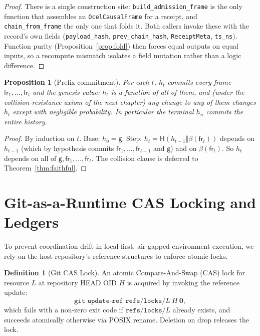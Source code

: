 \documentclass[11pt,oneside]{book}
\theoremstyle{definition}
\newtheorem{definition}{Definition}[chapter]
\theoremstyle{plain}
\newtheorem{proposition}[theorem]{Proposition}
\theoremstyle{remark}
\newcommand{\chainH}{\mathsf{H}}               %
\newcommand{\fr}{\mathsf{fr}}                   %
\newcommand{\body}{\beta}                       %
\newcommand{\code}[1]{\texttt{#1}}
\newcommand{\concat}{\mathbin{\Vert}}           %
\newcommand{\Genesis}{\mathsf{g}}               %
\begin{document}
\begin{proof}
There is a single construction site: \code{build\_admission\_frame} is the only function that
assembles an \code{OcelCausalFrame} for a receipt, and \code{chain\_from\_frame} the only one
that folds it. %
Both callers invoke these with the record's own fields
(\code{payload\_hash}, \code{prev\_chain\_hash}, \code{ReceiptMeta}, \code{ts\_ns}). %
Function
purity (Proposition~\ref{prop:fold}) then forces equal outputs on equal inputs, so a
recompute mismatch isolates a field mutation rather than a logic difference. %
 \end{proof}

\begin{proposition}[Prefix commitment]\label{prop:prefix}
For each $t$, $h_t$ commits every frame $\fr_1,\dots,\fr_t$ and the genesis value: $h_t$ is a
function of all of them, and (under the collision-resistance axiom of the next chapter) any
change to any of them changes $h_t$ except with negligible probability. %
In particular the
terminal $h_n$ commits the entire history. %
\end{proposition}

\begin{proof}
By induction on $t$. %
Base: $h_0=\Genesis$. %
Step: $h_t=\chainH(h_{t-1}\concat\body(\fr_t))$
depends on $h_{t-1}$ (which by hypothesis commits $\fr_1,\dots,\fr_{t-1}$ and $\Genesis$) and
on $\body(\fr_t)$. %
So $h_t$ depends on all of $\Genesis,\fr_1,\dots,\fr_t$. %
The collision
clause is deferred to Theorem~\ref{thm:faithful}. %
 \end{proof}

\section{Git-as-a-Runtime CAS Locking and Ledgers}

To prevent coordination drift in local-first, air-gapped environment execution, we rely on the host repository's reference structures to enforce atomic locks. %

\begin{definition}[Git CAS Lock]\label{def:gitlock}
An atomic Compare-And-Swap (CAS) lock for resource $L$ at repository HEAD OID $H$ is acquired by invoking the reference update: %
\begin{equation}\label{eq:gitlock}
\code{git update-ref refs/locks/}L\ H\ \bm 0,
\end{equation}
which fails with a non-zero exit code if $\code{refs/locks/}L$ already exists, and succeeds atomically otherwise via POSIX rename. %
Deletion on drop releases the lock. %
\end{definition}
\end{document}
